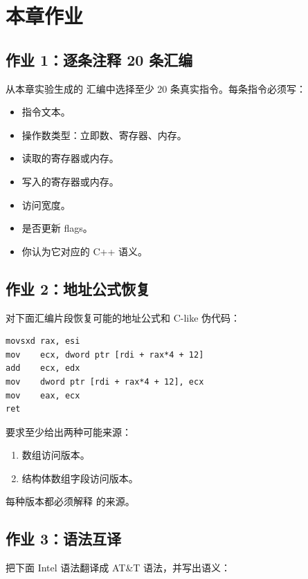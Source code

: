 \section{本章作业}

\begin{exercisebox}
\subsection*{作业 1：逐条注释 20 条汇编}

从本章实验生成的  汇编中选择至少 20 条真实指令。每条指令必须写：

\begin{itemize}
  \item 指令文本。
  \item 操作数类型：立即数、寄存器、内存。
  \item 读取的寄存器或内存。
  \item 写入的寄存器或内存。
  \item 访问宽度。
  \item 是否更新 flags。
  \item 你认为它对应的 C++ 语义。
\end{itemize}

\subsection*{作业 2：地址公式恢复}

对下面汇编片段恢复可能的地址公式和 C-like 伪代码：

\begin{lstlisting}
movsxd rax, esi
mov    ecx, dword ptr [rdi + rax*4 + 12]
add    ecx, edx
mov    dword ptr [rdi + rax*4 + 12], ecx
mov    eax, ecx
ret
\end{lstlisting}

要求至少给出两种可能来源：

\begin{enumerate}
  \item {} 数组访问版本。
  \item 结构体数组字段访问版本。
\end{enumerate}

每种版本都必须解释  的来源。

\subsection*{作业 3：语法互译}

把下面 Intel 语法翻译成 AT\&T 语法，并写出语义：


\end{exercisebox}
